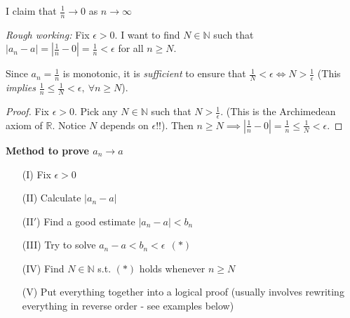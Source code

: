 \documentclass[10pt,twoside]{scrartcl}
\begin{document}
\begin{example}
I claim that $\frac{1}{n} \to 0$ as $n \to \infty$

\textit{Rough working:} Fix $\epsilon >0$. I want to find $N \in \mathbb{N}$ such that $|a_n - a| = |\frac{1}{n} - 0| = \frac{1}{n} < \epsilon$ for all $n \geq N$. 
\begin{center}
\end{center}


Since $a_n = \frac{1}{n}$ is monotonic, it is \emph{sufficient} to ensure that $\frac{1}{N} < \epsilon \iff N > \frac{1}{\epsilon}$ (This \emph{implies} $\frac{1}{n} \leq \frac{1}{N} < \epsilon,~\forall n \geq N$).

\begin{proof}
Fix $\epsilon >0$. 
 Pick any $N \in \mathbb{N}$ such that $N > \frac{1}{\epsilon}$. (This is the Archimedean axiom of $\mathbb{R}$. Notice $N$ depends on $\epsilon$!!). Then $n \geq N \implies |\frac{1}{n}-0| = \frac{1}{n} \leq \frac{1}{N} < \epsilon$.
\end{proof}
\end{example}


\textbf{Method to prove $a_n \to a$}
\begin{enumerate}
\item[(I)] Fix $\epsilon > 0$
\item[(II)] Calculate $|a_n - a|$
\item[(II$'$)] Find a good estimate $|a_n - a| < b_n$
\item[(III)] Try to solve $a_n - a < b_n < \epsilon ~~(*)$
\item[(IV)] Find $N \in \mathbb{N}$ s.t. $(*)$ holds whenever $n \geq N$
\item[(V)] Put everything together into a logical proof (usually involves rewriting everything in reverse order - see examples below)
\end{enumerate}~
\end{document}
